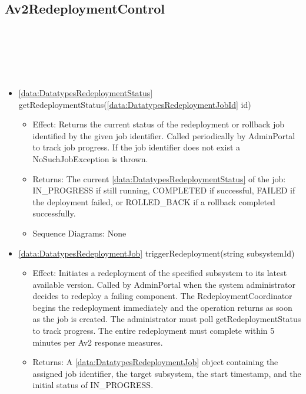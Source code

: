   \subsection{Av2RedeploymentControl}\label{int:InterfacesAv2RedeploymentControl}
    \begin{description}
      \item[Provided by:] \iconcomponent{}~
      \item[Required by:] \iconcomponent{}~ 
      \item[Operations:] ~
    \begin{itemize}[noitemsep,nolistsep,leftmargin=-.25cm]
      \item \textsf{\ref{data:DatatypesRedeploymentStatus} getRedeploymentStatus(\ref{data:DatatypesRedeploymentJobId} id)}
        \begin{itemize}[noitemsep,nolistsep]
           \item Effect: Returns the current status of the redeployment or rollback job identified by the given job identifier. Called periodically by AdminPortal to track job progress. If the job identifier does not exist a NoSuchJobException is thrown. 
           \item Returns: The current \ref{data:DatatypesRedeploymentStatus} of the job: IN\_PROGRESS if still running, COMPLETED if successful, FAILED if the deployment failed, or ROLLED\_BACK if a rollback completed successfully.
           \item Sequence Diagrams: None
        \end{itemize}
      \item \textsf{\ref{data:DatatypesRedeploymentJob} triggerRedeployment(string subsystemId)}
        \begin{itemize}[noitemsep,nolistsep]
           \item Effect: Initiates a redeployment of the specified subsystem to its latest available version. Called by AdminPortal when the system administrator decides to redeploy a failing component. The RedeploymentCoordinator begins the redeployment immediately and the operation returns as soon as the job is created. The administrator must poll getRedeploymentStatus to track progress. The entire redeployment must complete within 5 minutes per Av2 response measures. 
           \item Returns: A \ref{data:DatatypesRedeploymentJob} object containing the assigned job identifier, the target subsystem, the start timestamp, and the initial status of IN\_PROGRESS.

\end{itemize}
\end{itemize}
\end{description}
